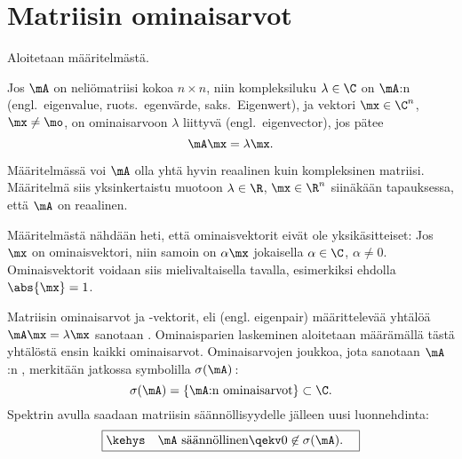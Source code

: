 \section{Matriisin ominaisarvot} \label{matriisin ominaisarvot}
\alku

Aloitetaan määritelmästä.
\begin{Def} 
Jos $\mA$ on neliömatriisi kokoa $n\times n$, niin kompleksiluku $\lambda\in\C$ on $\mA$:n 
 (engl.\ eigenvalue, ruots.\ egenvärde, saks.\ Eigenwert), ja vektori
$\mx\in\C^n$, $\mx\neq\mo$, on ominaisarvoon $\lambda$ liittyvä 
(engl.\ eigenvector), jos pätee
\[
\mA\mx=\lambda\mx.
\]
\end{Def}
Määritelmässä voi $\mA$ olla yhtä hyvin reaalinen kuin kompleksinen matriisi. Määritelmä siis 
 yksinkertaistu muotoon $\lambda\in\R$, $\mx\in\R^n$ siinäkään tapauksessa, että $\mA$
on reaalinen.

Määritelmästä nähdään heti, että ominaisvektorit eivät ole yksikäsitteiset: Jos $\mx$ on 
ominaisvektori, niin samoin on $\alpha\mx$ jokaisella $\alpha\in\C$, $\alpha\neq 0$. 
%
Ominaisvektorit voidaan siis  mielivaltaisella tavalla, esimerkiksi ehdolla 
$\abs{\mx}=1$.

%
Matriisin ominaisarvot ja -vektorit, eli  (engl. eigenpair) määrittelevää 
yhtälöä $\mA\mx=\lambda\mx$ sanotaan . Ominaisparien laskeminen 
aloitetaan määrämällä tästä yhtälöstä ensin kaikki ominaisarvot. Ominaisarvojen joukkoa, jota
sanotaan $\mA$:n , merkitään jatkossa symbolilla $\sigma(\mA)\,$:
\[
\sigma(\mA)=\{\mA\text{:n ominaisarvot}\} \subset\C.
\]
Spektrin avulla saadaan matriisin säännöllisyydelle jälleen uusi luonnehdinta:
\[
\boxed{\kehys\quad \mA\ \text{säännöllinen} \qekv 0\not\in\sigma(\mA). \quad}
\]

